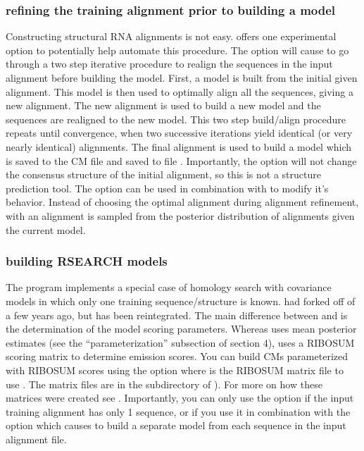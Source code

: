 \subsubsection{refining the training alignment prior to building a model}
Constructing structural RNA alignments is not easy. 
offers one experimental option to potentially help automate this
procedure. The  option will cause  to
go through a two step iterative procedure to realign the sequences in
the input alignment before building the model. First, a model is built
from the initial given alignment. This model is then used to optimally
align all the sequences, giving a new alignment. The new alignment is
used to build a new model and the sequences are realigned to the new
model. This two step build/align procedure repeats until convergence,
when two successive iterations yield identical (or very nearly
identical) alignments. The final alignment is used to build a model
which is saved to the CM file and saved to file
. Importantly, the  option will not change
the consensus structure of the initial alignment, so this is not a
structure prediction tool. The  option can be used in
combination with  to modify it's behavior. Instead of
choosing the optimal alignment during alignment refinement, with
 an alignment is sampled from the posterior distribution
of alignments given the current model.

\subsubsection{building RSEARCH models}
The  program \cite{KleinEddy03} implements a special case of
homology search with covariance models in which only one training
sequence/structure is known.  had forked off of
 a few years ago, but has been reintegrated.
The main difference between 
and  is the determination of the model scoring
parameters. Whereas  uses mean posterior estimates
(see the ``parameterization'' subsection of section 4),
 uses a RIBOSUM scoring matrix to determine
emission scores. You can build CMs parameterized with
RIBOSUM scores using the  option where 
is the RIBOSUM matrix file to use . The matrix files are in the
 subdirectory of ). For more on how
these matrices were created see \cite{KleinEddy03}. Importantly, you
can only use the  option if the input training
alignment has only 1 sequence, or if you use it in combination with
the  option which causes  to build a
separate model from each sequence in the input alignment file.

